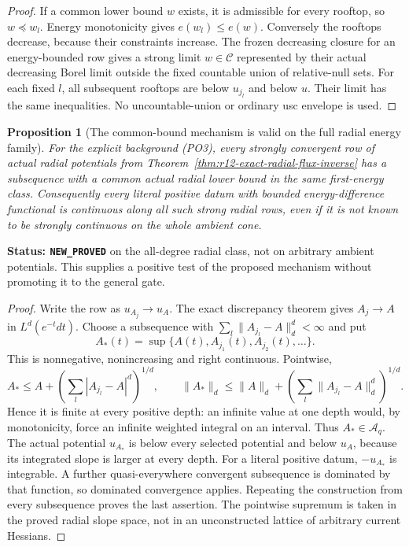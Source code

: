 \documentclass[11pt,a4paper]{article}
\numberwithin{equation}{section}
\newtheorem{proposition}[theorem]{Proposition}
\theoremstyle{definition}
\theoremstyle{remark}
\begin{document}
\begin{proof}
If a common lower bound $w$ exists, it is admissible
for every rooftop, so $w\preceq w_l$.  Energy
monotonicity gives $e(w_l)\le e(w)$.
Conversely the rooftops decrease, because their
constraints increase.  The frozen decreasing closure
for an energy-bounded row gives a strong limit
$w\in\mathscr C$ represented by their actual
decreasing Borel limit outside the fixed countable
union of relative-null sets.  For each fixed $l$,
all subsequent rooftops are below $u_{j_l}$ and
below $u$.  Their limit has the same inequalities.
No uncountable-union or ordinary usc envelope is used.
\end{proof}

\begin{proposition}[The common-bound mechanism is valid on the full radial energy family]
\label{prop:r12-radial-common-lower-subsequence}
For the explicit background \textup{(PO3)}, every strongly
convergent row of actual radial potentials from
Theorem~\ref{thm:r12-exact-radial-flux-inverse} has a
subsequence with a common \emph{actual radial} lower
bound in the same first-energy class.  Consequently
every literal positive datum with bounded energy-difference
functional is continuous along all such strong radial rows,
even if it is not known to be strongly continuous on the
whole ambient cone.
\end{proposition}

\noindent\textbf{Status: \texttt{NEW\_PROVED}} on the
all-degree radial class, not on arbitrary ambient potentials.
This supplies a positive test of the proposed mechanism
without promoting it to the general gate.

\begin{proof}
Write the row as $u_{A_j}\to u_A$.  The exact discrepancy
theorem gives $A_j\to A$ in $L^d(e^{-t}dt)$.
Choose a subsequence with
$\sum_l\|A_{j_l}-A\|_d^d<\infty$ and put
\[
                  A_*(t)=\sup\{A(t),A_{j_1}(t),A_{j_2}(t),\ldots\}.
 \tag{LG3a}
\]
This is nonnegative, nonincreasing and right continuous.
Pointwise,
\[
  A_*\le A+\left(\sum_l|A_{j_l}-A|^d\right)^{1/d},
  \qquad
  \|A_*\|_d
        \le\|A\|_d+\left(\sum_l\|A_{j_l}-A\|_d^d\right)^{1/d}.
\]
Hence it is finite at every positive depth: an infinite
value at one depth would, by monotonicity, force an
infinite weighted integral on an interval.  Thus
$A_*\in\mathscr A_q$.  The actual potential $u_{A_*}$
is below every selected potential and below $u_A$,
because its integrated slope is larger at every depth.
For a literal positive datum, $-u_{A_*}$ is integrable.
A further quasi-everywhere convergent subsequence is
dominated by that function, so dominated convergence
applies.  Repeating the construction from every
subsequence proves the last assertion.  The pointwise supremum
is taken in the proved radial slope space, not in an
unconstructed lattice of arbitrary current Hessians.
\end{proof}
\end{document}
